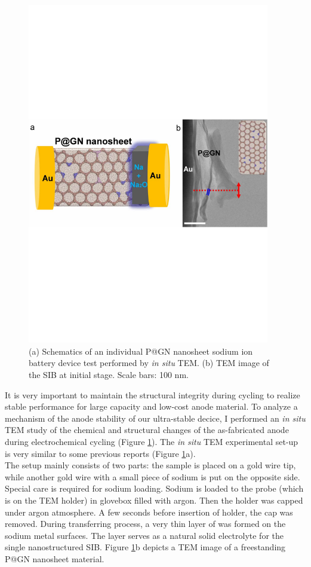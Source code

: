 \begin{figure}  
\centering
\includegraphics[width=300pt,angle=0]{figures/figure4_3ab}
\caption[{\it In situ} probing on P@GN SIB setup]
{
(a) Schematics of an individual P@GN nanosheet sodium ion battery device test performed by {\em in situ} TEM. 
(b) TEM image of the SIB at initial stage. Scale bars: 100 nm.
\label{fig:4_3ab}}
\end{figure}

It is very important to maintain the structural integrity during cycling to realize stable performance for large capacity and low-cost anode material.\cite{Liu2014a} 
To analyze a mechanism of the anode stability of our ultra-stable decice, I performed an {\em in situ} TEM study of the chemical and structural changes of the as-fabricated anode during electrochemical cycling (Figure \ref{fig:4_3ab}). The {\em in situ} TEM experimental set-up is very similar to some previous reports (Figure \ref{fig:4_3ab}a).\cite{Wang2014f,Wang2012g} \\
The setup mainly consists of two parts: the sample is placed on a gold wire tip, while another gold wire with a small piece of sodium is put on the opposite side. Special care is required for sodium loading. Sodium is loaded to the probe (which is on the TEM holder) in glovebox filled with argon. Then the holder was capped under argon atmosphere. A few seconds before insertion of holder, the cap was removed. 
During transferring process, a very thin layer of  was formed on the sodium metal surfaces. The  layer serves as a natural solid electrolyte for the single nanostructured SIB. Figure \ref{fig:4_3ab}b depicts a TEM image of a freestanding P@GN nanosheet material. 

